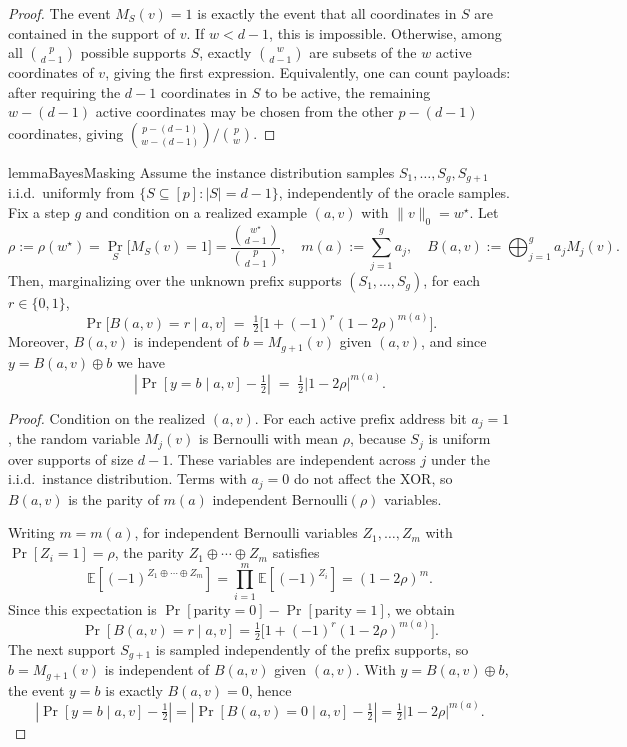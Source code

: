\documentclass{article}
\begin{document}
\begin{proof}
The event $M_S(v)=1$ is exactly the event that all coordinates in $S$ are contained in the support of $v$.
If $w<d-1$, this is impossible. Otherwise, among all $\binom{p}{d-1}$ possible supports $S$, exactly $\binom{w}{d-1}$ are subsets of the $w$ active coordinates of $v$, giving the first expression.
Equivalently, one can count payloads: after requiring the $d-1$ coordinates in $S$ to be active, the remaining $w-(d-1)$ active coordinates may be chosen from the other $p-(d-1)$ coordinates, giving $\binom{p-(d-1)}{w-(d-1)}/\binom{p}{w}$.
\end{proof}

\begin{restatable}{lemma}{BayesMasking}\label{lem:bayes_masking}
Assume the instance distribution samples $S_1,\dots,S_g,S_{g+1}$ i.i.d.\ uniformly from $\{S\subseteq[p]:|S|=d-1\}$,
independently of the oracle samples. Fix a step $g$ and condition on a realized example $(a,v)$ with $\|v\|_0=w^\star$.
Let
\[
\rho:=\rho(w^\star)=\Pr_{S}\!\big[M_S(v)=1\big]=\frac{\binom{w^\star}{d-1}}{\binom{p}{d-1}},
\quad
m(a):=\sum_{j=1}^g a_j,
\quad
B(a,v):=\bigoplus_{j=1}^{g} a_j M_j(v).
\]
Then, marginalizing over the unknown prefix supports $(S_1,\dots,S_g)$, for each $r \in \{0,1\}$,
\[
\Pr\big[B(a,v)=r \mid a,v\big]
\;=\;
\tfrac{1}{2}\big[1+(-1)^r(1-2\rho)^{m(a)}\big].
\]
Moreover, $B(a,v)$ is independent of $b=M_{g+1}(v)$ given $(a,v)$, and since $y=B(a,v)\oplus b$ we have
\[
\left|\Pr[y=b\mid a,v]-\tfrac12\right|
\;=\;
\tfrac{1}{2}|1-2\rho|^{m(a)}.
\]
\end{restatable}

\begin{proof}
Condition on the realized $(a,v)$. For each active prefix address bit $a_j=1$, the random variable $M_j(v)$ is Bernoulli with mean $\rho$, because $S_j$ is uniform over supports of size $d-1$. These variables are independent across $j$ under the i.i.d.\ instance distribution. Terms with $a_j=0$ do not affect the XOR, so $B(a,v)$ is the parity of $m(a)$ independent Bernoulli$(\rho)$ variables.

Writing $m=m(a)$, for independent Bernoulli variables $Z_1,\dots,Z_m$ with $\Pr[Z_i=1]=\rho$, the parity $Z_1\oplus\cdots\oplus Z_m$ satisfies
\[
\mathbb E[(-1)^{Z_1\oplus\cdots\oplus Z_m}]
=\prod_{i=1}^m \mathbb E[(-1)^{Z_i}]
=(1-2\rho)^m.
\]
Since this expectation is $\Pr[\mathrm{parity}=0]-\Pr[\mathrm{parity}=1]$, we obtain
\[
\Pr[B(a,v)=r\mid a,v]
=\tfrac12\big[1+(-1)^r(1-2\rho)^{m(a)}\big].
\]
The next support $S_{g+1}$ is sampled independently of the prefix supports, so $b=M_{g+1}(v)$ is independent of $B(a,v)$ given $(a,v)$. With $y=B(a,v)\oplus b$, the event $y=b$ is exactly $B(a,v)=0$, hence
\[
\left|\Pr[y=b\mid a,v]-\tfrac12\right|
=\left|\Pr[B(a,v)=0\mid a,v]-\tfrac12\right|
=\tfrac12 |1-2\rho|^{m(a)}.
\]
\end{proof}
\end{document}
